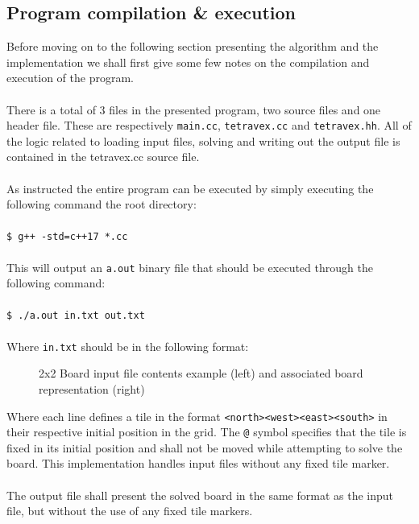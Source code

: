 \documentclass[11pt]{article}
\begin{document}
\begin{multicols*}{2}
\subsection{Program compilation \& execution}
Before moving on to the following section presenting the algorithm and the
implementation we shall first give some few notes on the compilation and
execution of the program.\\\\ There is a total of 3 files in the presented
program, two source files and one header file. These are respectively
\texttt{main.cc}, \texttt{tetravex.cc} and \texttt{tetravex.hh}. All of the
logic related to loading input files, solving and writing out the output file
is contained in the tetravex.cc source file.\\\\ As instructed the entire program
can be executed by simply executing the following command the root
directory:\\\\ \texttt{\$ g++ -std=c++17 *.cc}\\\\
This will output an \texttt{a.out} binary file that should be executed through
the following command:\\\\ \texttt{\$ ./a.out in.txt out.txt}\\\\
Where \texttt{in.txt} should be in the following format:
\begin{figure}[H]
  \centering
  \fontsize{11pt}{11pt}\selectfont
  \begin{varwidth}{\linewidth}
    
  \end{varwidth}
  \qquad\quad
  \begin{varwidth}{\linewidth}
    
  \end{varwidth}
  \caption{2x2 Board input file contents example (left) and associated board
    representation (right)}
  \label{fig:input-file-example}
\end{figure}
\noindent Where each line defines a tile in the format
\texttt{<north><west><east><south>} in their respective initial position in the
grid. The \texttt{@} symbol specifies that the tile is fixed in its initial
position and shall not be moved while attempting to solve the board. This
implementation handles input files without any fixed tile marker.\\\\ The output
file shall present the solved board in the same format as the input file, but
without the use of any fixed tile markers.

\end{multicols*}
\end{document}
